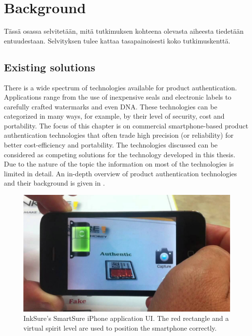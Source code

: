 \documentclass[thesis.tex]{subfiles}
\begin{document}
\chapter{Background}
\label{chapter:background}

Tässä osassa selvitetään, mitä tutkimuksen kohteena olevasta aiheesta tiedetään entuudestaan. Selvityksen tulee kattaa tasapainoisesti koko tutkimuskenttä.

\section{Existing solutions}

There is a wide spectrum of technologies available for product authentication. Applications range from the use of inexpensive seals and electronic labels to carefully crafted watermarks and even DNA. These technologies can be categorized in many ways, for example, by their level of security, cost and portability. The focus of this chapter is on commercial smartphone-based product authentication technologies that often trade high precision (or reliability) for better cost-efficiency and portability. The technologies discussed can be considered as competing solutions for the technology developed in this thesis. Due to the nature of the topic the information on most of the technologies is limited in detail. An in-depth overview of product authentication technologies and their background is given in \cite{kuosmanen}.

\begin{figure}[ht]
\centering \includegraphics[width=13.25cm]{images/existing_solutions/smartsure}
\caption{InkSure's SmartSure iPhone application UI. The red rectangle and a virtual spirit level are used to position the smartphone correctly. \cite{inksure} \label{figure:inksure}}
\end{figure}
\end{document}
